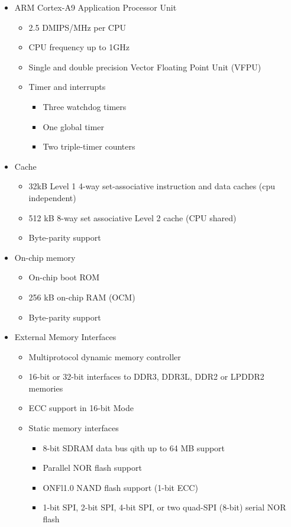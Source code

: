 \begin{itemize}
	\item ARM Cortex-A9 Application Processor Unit
	\begin{itemize}
		\item 2.5 DMIPS/MHz per CPU
		\item CPU frequency up to 1GHz
		\item Single and double precision Vector Floating Point Unit (VFPU)
		\item Timer and interrupts
		\begin{itemize}
			\item Three watchdog timers
			\item One global timer
			\item Two triple-timer counters
		\end{itemize}
	\end{itemize}
	\item Cache
	\begin{itemize}
		\item 32kB Level 1 4-way set-associative instruction and data caches (cpu independent)
		\item 512 kB 8-way set associative Level 2 cache (CPU shared)
		\item Byte-parity support
	\end{itemize}
	\item On-chip memory
	\begin{itemize}
		\item On-chip boot ROM
		\item 256 kB on-chip RAM (OCM)
		\item Byte-parity support
	\end{itemize}
	\item External Memory Interfaces
	\begin{itemize}
		\item Multiprotocol dynamic memory controller
		\item 16-bit or 32-bit interfaces to DDR3, DDR3L, DDR2 or LPDDR2 memories
		\item ECC support in 16-bit Mode
		\item Static memory interfaces
		\begin{itemize}
			\item 8-bit SDRAM data bus qith up to 64 MB support
			\item Parallel NOR flash support
			\item ONFl1.0 NAND flash support (1-bit ECC)
			\item 1-bit SPI, 2-bit SPI, 4-bit SPI, or two quad-SPI (8-bit) serial NOR flash

\end{itemize}
\end{itemize}
\end{itemize}
